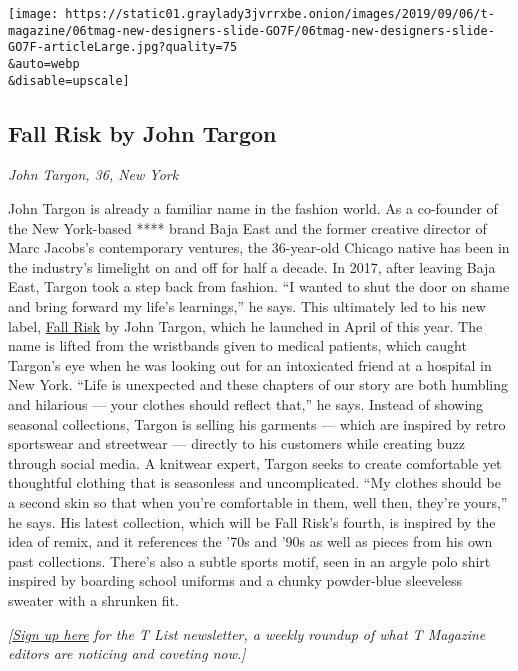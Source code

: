 \texttt{[image: https://static01.graylady3jvrrxbe.onion/images/2019/09/06/t-magazine/06tmag-new-designers-slide-GO7F/06tmag-new-designers-slide-GO7F-articleLarge.jpg?quality=75\\\&auto=webp\\\&disable=upscale]}

\hypertarget{fall-risk-by-john-targon}{%
\subsection{Fall Risk by John Targon}\label{fall-risk-by-john-targon}}

\emph{John Targon, 36, New York}

John Targon is already a familiar name in the fashion world. As a
co-founder of the New York-based **** brand Baja East and the former
creative director of Marc Jacobs's contemporary ventures, the
36-year-old Chicago native has been in the industry's limelight on and
off for half a decade. In 2017, after leaving Baja East, Targon took a
step back from fashion. ``I wanted to shut the door on shame and bring
forward my life's learnings,'' he says. This ultimately led to his new
label, \href{https://www.instagram.com/fallriskinc/}{Fall Risk} by John
Targon, which he launched in April of this year. The name is lifted from
the wristbands given to medical patients, which caught Targon's eye when
he was looking out for an intoxicated friend at a hospital in New York.
``Life is unexpected and these chapters of our story are both humbling
and hilarious --- your clothes should reflect that,'' he says. Instead
of showing seasonal collections, Targon is selling his garments ---
which are inspired by retro sportswear and streetwear --- directly to
his customers while creating buzz through social media. A knitwear
expert, Targon seeks to create comfortable yet thoughtful clothing that
is seasonless and uncomplicated. ``My clothes should be a second skin so
that when you're comfortable in them, well then, they're yours,'' he
says. His latest collection, which will be Fall Risk's fourth, is
inspired by the idea of remix, and it references the '70s and '90s as
well as pieces from his own past collections. There's also a subtle
sports motif, seen in an argyle polo shirt inspired by boarding school
uniforms and a chunky powder-blue sleeveless sweater with a shrunken
fit.

\emph{{[}}\href{https://www.nytimes3xbfgragh.onion/newsletters/t-list?module=inline}{\emph{Sign
up here}} \emph{for the T List newsletter, a weekly roundup of what T
Magazine editors are noticing and coveting now.{]}}

